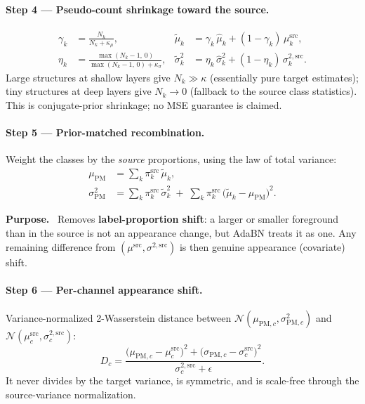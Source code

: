 \documentclass[11pt,a4paper]{article}
\newcommand{\src}{\mathrm{src}}
\newcommand{\PM}{\mathrm{PM}}
\newenvironment{purpose}{\par\smallskip\noindent\textbf{Purpose.}\ }{\par\smallskip}
\begin{document}
\paragraph{Step 4 --- Pseudo-count shrinkage toward the source.}
\begin{align}
\gamma_k &= \frac{N_k}{N_k+\kappa_\mu}, &
\tilde\mu_k &= \gamma_k\,\hat\mu_k + (1-\gamma_k)\,\mu^{\src}_k, \\
\eta_k &= \frac{\max(N_k-1,\,0)}{\max(N_k-1,\,0)+\kappa_\sigma}, &
\tilde\sigma^2_k &= \eta_k\,\hat\sigma^2_k + (1-\eta_k)\,\sigma^{2,\src}_k .
\end{align}
Large structures at shallow layers give $N_k\gg\kappa$ (essentially pure target estimates); tiny structures at deep layers give $N_k\to0$ (fallback to the source class statistics). This is conjugate-prior shrinkage; no MSE guarantee is claimed.

\paragraph{Step 5 --- Prior-matched recombination.}
Weight the classes by the \emph{source} proportions, using the law of total variance:
\begin{align}
\mu_{\PM} &= \sum_k \pi^{\src}_k\,\tilde\mu_k, \\
\sigma^2_{\PM} &= \sum_k \pi^{\src}_k\,\tilde\sigma^2_k
\;+\; \sum_k \pi^{\src}_k\,\bigl(\tilde\mu_k-\mu_{\PM}\bigr)^2 .
\end{align}
\begin{purpose}
Removes \textbf{label-proportion shift}: a larger or smaller foreground than in the source is not an appearance change, but AdaBN treats it as one. Any remaining difference from $(\mu^{\src},\sigma^{2,\src})$ is then genuine appearance (covariate) shift.
\end{purpose}

\paragraph{Step 6 --- Per-channel appearance shift.}
Variance-normalized 2-Wasserstein distance between $\mathcal{N}(\mu_{\PM,c},\sigma^2_{\PM,c})$ and $\mathcal{N}(\mu^{\src}_c,\sigma^{2,\src}_c)$:
\begin{equation}
D_c = \frac{\bigl(\mu_{\PM,c}-\mu^{\src}_c\bigr)^2 + \bigl(\sigma_{\PM,c}-\sigma^{\src}_c\bigr)^2}{\sigma^{2,\src}_c + \epsilon}.
\end{equation}
It never divides by the target variance, is symmetric, and is scale-free through the source-variance normalization.
\end{document}
